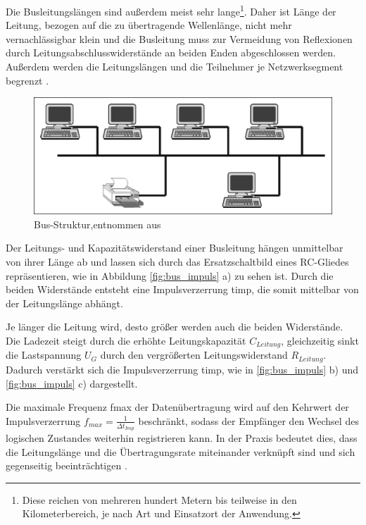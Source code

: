Die Busleitungslängen sind außerdem meist sehr lange\footnote{Diese reichen von mehreren hundert Metern bis teilweise in den Kilometerbereich, je nach Art und Einsatzort der Anwendung.}. Daher ist Länge der Leitung, bezogen auf die zu übertragende Wellenlänge, nicht mehr vernachlässigbar klein und die Busleitung muss zur Vermeidung von Reflexionen durch Leitungsabschlusswiderstände an beiden Enden abgeschlossen werden. Außerdem werden die Leitungslängen und die Teilnehmer je Netzwerksegment begrenzt \cite[S.~3f.]{schn06}.

\begin{figure}
\centering
\includegraphics[width=\textwidth]{abbildungen/20160109_busstruktur}
\caption[Bus-Struktur]{Bus-Struktur,entnommen aus \cite[S.~3]{schn06}}
\label{fig:bus_struktur}
\end{figure}


Der Leitungs- und Kapazitätswiderstand einer Busleitung hängen unmittelbar von ihrer Länge ab und lassen sich durch das Ersatzschaltbild eines RC-Gliedes repräsentieren, wie in Abbildung \ref{fig:bus_impuls} a) zu sehen ist. Durch die beiden Widerstände entsteht eine Impulsverzerrung \gls{timp}, die somit mittelbar von der Leitungslänge abhängt.

Je länger die Leitung wird, desto größer werden auch die beiden Widerstände. Die Ladezeit steigt durch die erhöhte Leitungskapazität $C_{Leitung}$, gleichzeitig sinkt die Lastspannung $U_{G}$ durch den vergrößerten Leitungswiderstand $R_{Leitung}$. Dadurch verstärkt sich die Impulsverzerrung \gls{timp}, wie in \ref{fig:bus_impuls} b) und \ref{fig:bus_impuls} c) dargestellt.

Die maximale Frequenz \gls{fmax} der Datenübertragung wird auf den Kehrwert der Impulsverzerrung $f_{max}=\frac{1}{\Delta t_{Imp}}$ beschränkt, sodass der Empfänger den Wechsel des logischen Zustandes weiterhin registrieren kann. In der Praxis bedeutet dies, dass die Leitungslänge und die Übertragungsrate miteinander verknüpft sind und sich gegenseitig beeinträchtigen \cite[S.~4f.]{schn06}.

